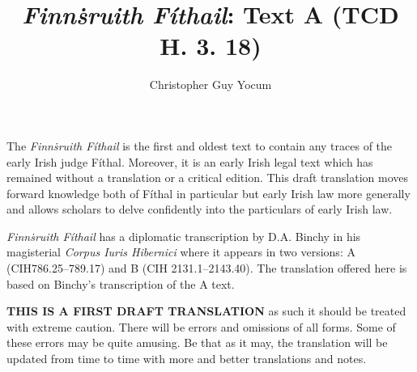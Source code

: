\documentclass[11pt]{article}
\author{Christopher Guy Yocum}
\title{\emph{Finn\.{s}ruith F\'{i}thail}: Text A (TCD H. 3. 18)}
\begin{document}
\maketitle

The \emph{Finn\.{s}ruith F\'{i}thail} is the first and oldest text to contain any traces of the early Irish judge F\'{i}thal.  Moreover, it is an early Irish legal text which has remained without a translation or a critical edition.  This draft translation moves forward knowledge both of F\'{i}thal in particular but early Irish law more generally and allows scholars to delve confidently into the particulars of early Irish law.

\emph{Finn\.{s}ruith F\'{i}thail} has a diplomatic transcription by D.A. Binchy in his magisterial \emph{Corpus Iuris Hibernici} where it appears in two versions: A (CIH786.25--789.17) and B (CIH 2131.1--2143.40).  The translation offered here is based on Binchy's transcription of the A text.

{\Large \textbf{THIS IS A FIRST DRAFT TRANSLATION} as such it should be treated with extreme caution.  There will be errors and omissions of all forms.  Some of these errors may be quite amusing.  Be that as it may, the translation will be updated from time to time with more and better translations and notes.}

\newpage
\end{document}
